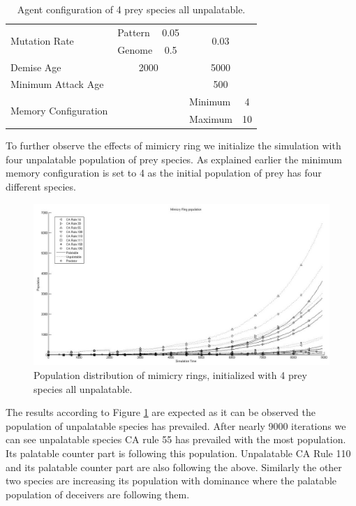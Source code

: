 \begin{table}[H]
\begin{tabular}{|l|l|c|c|l|c|}
  \multirow{2}{*}{Mutation Rate} & Pattern   & \multicolumn{2}{|c|}{0.05} & \multicolumn{2}{|c|}{\multirow{2}{*}{0.03}} \\ \cline{2-4}
  						 									 & Genome    & \multicolumn{2}{|c|}{0.5}  & \multicolumn{2}{|c|}{} \\ \hline
  Demise Age	 									 & \multicolumn{3}{|c|}{2000}							& \multicolumn{2}{|c|}{5000} \\ \hline
  Minimum Attack Age						 & \multicolumn{3}{|c|}{} 						    & \multicolumn{2}{|c|}{500} \\ \hline
  \multirow{2}{*}{Memory Configuration} & \multicolumn{3}{|c|}{} 					& Minimum & 4 \\ \cline{5-6}
   																			& \multicolumn{3}{|c|}{} 					& Maximum & 10 \\ \hline  
\end{tabular}
\caption{Agent configuration of 4 prey species all unpalatable.}
\label{tab:config-table-4-prey-unpalatable}
\end{table}

To further observe the effects of mimicry ring we initialize the simulation with four unpalatable population of prey species. As explained earlier the minimum memory configuration is set to 4 as the initial population of prey has four different species. 

\begin{figure}[H]
	\centering
	\includegraphics[scale=0.40]{images/simTime-9k-4Prey-unp}
	\caption{Population distribution of mimicry rings, initialized with 4 prey species all unpalatable.}
	\label{fig:plot-4-prey-unp}
\end{figure}

The results according to Figure \ref{fig:plot-4-prey-unp} are expected as it can be observed the population of unpalatable species has prevailed. After nearly 9000 iterations we can see unpalatable species CA rule 55 has prevailed with the most population. Its palatable counter part is following this population. Unpalatable CA Rule 110 and its palatable counter part are also following the above. Similarly the other two species are increasing its population with dominance where the palatable population of deceivers are following them. 


